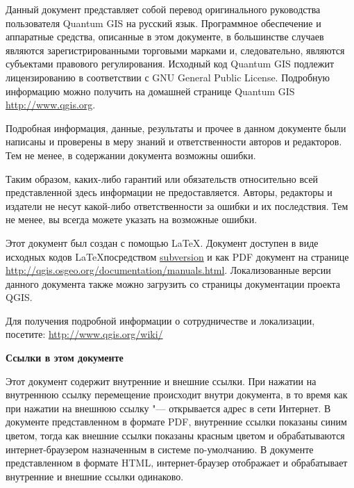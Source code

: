 \frontmatter
\pagestyle{scrplain}
\vspace{1cm}


Данный документ представляет собой перевод оригинального руководства
пользователя Quantum GIS на русский язык. Программное обеспечение и
аппаратные средства, описанные в этом документе, в большинстве случаев
являются зарегистрированными торговыми марками и, следовательно, являются
субъектами правового регулирования. Исходный код Quantum GIS подлежит
лицензированию в соответствии с GNU General Public License. Подробную
информацию можно получить на домашней странице Quantum GIS
\url{http://www.qgis.org}.
\par\bigskip
Подробная информация, данные, результаты и прочее в данном документе
были написаны и проверены в меру знаний и ответственности авторов и
редакторов. Тем не менее, в содержании документа возможны ошибки.
\par\bigskip
Таким образом, каких-либо гарантий или обязательств
относительно всей представленной здесь информации не предоставляется.
Авторы, редакторы и издатели не несут какой-либо ответственности за ошибки
и их последствия. Тем не менее, вы всегда можете указать на возможные ошибки.
\par\bigskip
Этот документ был создан с помощью \LaTeX. Документ доступен в виде
исходных кодов \LaTeX посредством
\href{http://wiki.qgis.org/qgiswiki/DocumentationWritersCorner}{subversion}
и как PDF документ на странице
\url{http://qgis.osgeo.org/documentation/manuals.html}.
Локализованные версии данного документа также можно загрузить со
страницы документации проекта QGIS.


Для получения подробной информации о сотрудничестве и локализации,
посетите: \url{http://www.qgis.org/wiki/}

\vspace{1cm}
\noindent
\textbf{Ссылки в этом документе}
\par\bigskip
Этот документ содержит внутренние и внешние ссылки. При нажатии на
внутреннюю ссылку перемещение происходит внутри документа, в то время
как при нажатии на внешнюю ссылку "--- открывается адрес в сети Интернет.
В документе представленном в формате PDF, внутренние ссылки показаны
синим цветом, тогда как внешние ссылки показаны красным цветом и
обрабатываются интернет-браузером назначенным в системе по-умолчанию. В
документе представленном в формате HTML, интернет-браузер отображает и
обрабатывает внутренние и внешние ссылки одинаково.

